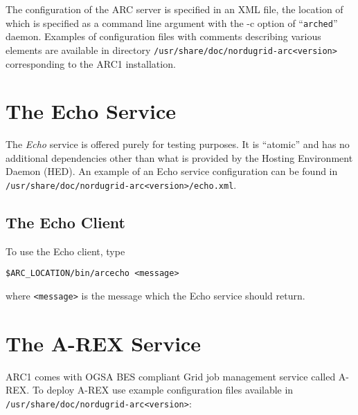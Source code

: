 \documentclass{article}                            %
\begin{document}
The configuration of the ARC server is specified in an XML file, the location of
which is specified as a command line argument with the -c option of
``\texttt{arched}'' daemon. Examples of configuration files with comments
describing various elements are available in directory
\texttt{/usr/share/doc/nordugrid-arc<version>} corresponding to the ARC1
installation.


\section{The Echo Service}
\label{sec:echo-service}

The \textit{Echo} service is offered purely for testing purposes. It is
``atomic'' and has no additional dependencies other than what is provided by the
Hosting Environment Daemon (HED). An example of an Echo service configuration
can be found in \texttt{/usr/share/doc/nordugrid-arc<version>/echo.xml}.


\subsection{The Echo Client}
\label{sec:echo-client}


To use the Echo client, type

\begin{lstlisting}
$ARC_LOCATION/bin/arcecho <message>
\end{lstlisting}

where \verb|<message>| is the message which the Echo service should return.


\section{The A-REX Service}
\label{sec:a-rex}

ARC1 comes with OGSA BES compliant Grid job management service called A-REX.
To deploy A-REX use example configuration files available in
\verb|/usr/share/doc/nordugrid-arc<version>|:
\end{document}
